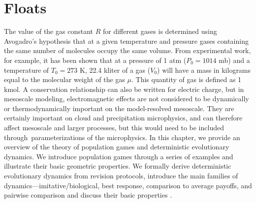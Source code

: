 \documentclass[onecolumn,authoryear]{els-mrw}
\begin{document}
\section{Floats}\label{chap1:sec6}
The value of the gas constant $R$ for different gases is determined
using Avogadro's hypothesis that at a given temperature and pressure
gases containing the same number of molecules occupy the same
volume. From experimental work, for example, it has been shown that at
a pressure of 1 atm ($P_0 = 1014$ mb) and a temperature of $T_0 = 273$
K, 22.4 kliter of a gas ($V_0$) will have a mass in kilograms equal to
the molecular weight of the gas $\mu$. This quantity of gas is defined
as 1 kmol. A conservation relationship can also be written for electric charge, but in mesoscale modeling, electromagnetic effects are not considered to be dynamically or thermodynamically important on the model-resolved mesoscale. They are certainly important on  cloud and precipitation microphysics, and can therefore affect mesoscale and larger processes, but this would need to be included through~parameterizations of the microphysics.
In this chapter, we provide an overview of the theory of population games and deterministic evolutionary dynamics.  We introduce population games through a series of examples and illustrate their basic geometric properties.  We formally derive deterministic evolutionary dynamics from revision protocols, introduce the main families of dynamics---imitative/biological, best response, comparison to average payoffs, and pairwise comparison and discuss their basic properties \cite{bib7}.
\end{document}

